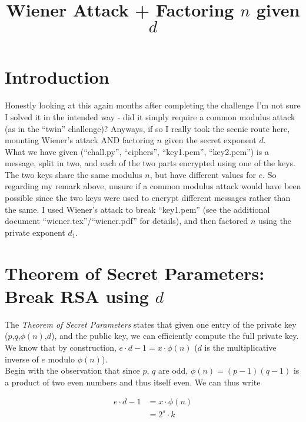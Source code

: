 \documentclass{article}
\title{Wiener Attack + Factoring $n$ given $d$}
\begin{document}
\maketitle

\section{Introduction}

Honestly looking at this again months after completing the challenge I'm not sure I solved it in the intended way - did it simply require a common modulus attack (as in the ``twin'' challenge)? Anyways, if so I really took the scenic route here, mounting Wiener's attack AND factoring $n$ given the secret exponent $d$.\\

What we have given (``chall.py'', ``ciphers'', ``key1.pem'', ``key2.pem'') is a message, split in two, and each of the two parts encrypted using one of the keys. The two keys share the same modulus $n$, but have different values for $e$. So regarding my remark above, unsure if a common modulus attack would have been possible since the two keys were used to encrypt different messages rather than the same. I used Wiener's attack to break ``key1.pem'' (see the additional document ``wiener.tex''/``wiener.pdf'' for details), and then factored $n$ using the private exponent $d_1$.

\section{Theorem of Secret Parameters: \\ Break RSA using $d$}

The \emph{Theorem of Secret Parameters} states that given one entry of the private key ($p$,$q$,$\phi(n)$,$d$), and the public key, we can efficiently compute the full private key.\\

We know that by construction, $e\cdot d - 1 = x\cdot \phi(n)$ ($d$ is the multiplicative inverse of $e$ modulo $\phi(n)$).\\

Begin with the observation that since $p$, $q$ are odd, $\phi(n)=(p-1)(q-1)$ is a product of two even numbers and thus itself even. We can thus write 

\begin{align*}
    e \cdot d-1 &= x \cdot \phi(n) \\
                &= 2^s \cdot k \\
\end{align*}
\end{document}

